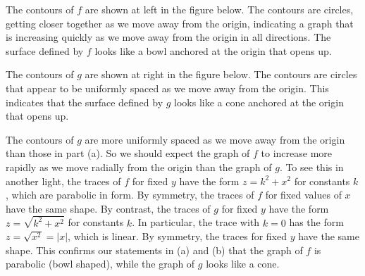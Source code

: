\begin{activitySolution}
\ba
\item The contours of $f$ are shown at left in the figure below.  The contours are circles, getting closer together as we move away from the origin, indicating a graph that is increasing quickly as we move away from the origin in all directions. The surface defined by $f$ looks like a bowl anchored at the origin that opens up. %
\item The contours of $g$ are shown at right in the figure below. The contours are circles that appear to be uniformly spaced as we move away from the origin. This indicates that the surface defined by $g$ looks like a cone anchored at the origin that opens up. %
    \item The contours of $g$ are more uniformly spaced as we move away from the origin than those  in part (a). So we should expect the graph of $f$ to increase more rapidly as we move radially from the origin than the graph of $g$. To see this in another light, the traces of $f$ for fixed $y$ have the form $z = k^2+x^2$ for constants $k$, which are parabolic in form. By symmetry, the traces of $f$ for fixed values of $x$ have the same shape. By contrast, the traces of $g$ for fixed $y$ have the form $z = \sqrt{k^2+x^2}$ for constants $k$. In particular, the trace with $k=0$ has the form $z = \sqrt{x^2} = | x |$, which is linear. By symmetry, the traces for fixed $y$ have the same shape. This confirms our statements in (a) and (b) that the graph of $f$ is parabolic (bowl shaped), while the graph of $g$ looks like a cone. 
    \ea
\begin{center}

\end{center}
\end{activitySolution}
